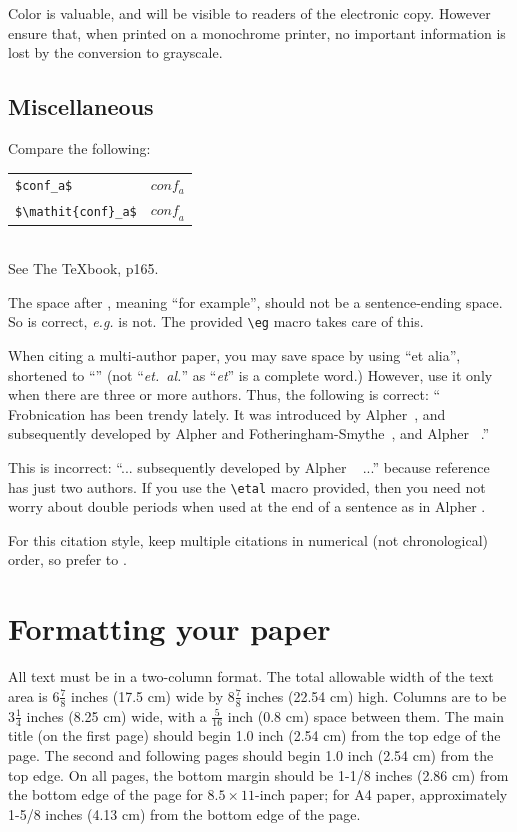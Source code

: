 \documentclass[10pt,twocolumn,letterpaper]{article}
\begin{document}
Color is valuable, and will be visible to readers of the electronic copy.
However ensure that, when printed on a monochrome printer, no important
information is lost by the conversion to grayscale.


\subsection{Miscellaneous}

\noindent
Compare the following:\\
\begin{tabular}{ll}
 \verb'$conf_a$' &  $conf_a$ \\
 \verb'$\mathit{conf}_a$' & $\mathit{conf}_a$
\end{tabular}\\
See The \TeX book, p165.

The space after \eg, meaning ``for example'', should not be a
sentence-ending space. So \eg is correct, {\em e.g.} is not.  The provided
\verb'\eg' macro takes care of this.

When citing a multi-author paper, you may save space by using ``et alia'',
shortened to ``\etal'' (not ``{\em et.\ al.}'' as ``{\em et}'' is a complete word.)
However, use it only when there are three or more authors.  Thus, the
following is correct: ``
   Frobnication has been trendy lately.
   It was introduced by Alpher~\cite{Alpher02}, and subsequently developed by
   Alpher and Fotheringham-Smythe~\cite{Alpher03}, and Alpher \etal~\cite{Alpher04}.''

This is incorrect: ``... subsequently developed by Alpher \etal~\cite{Alpher03} ...''
because reference~\cite{Alpher03} has just two authors.  If you use the
\verb'\etal' macro provided, then you need not worry about double periods
when used at the end of a sentence as in Alpher \etal.

For this citation style, keep multiple citations in numerical (not
chronological) order, so prefer \cite{Alpher03,Alpher02} to 
\cite{Alpher02,Alpher03}.


\section{Formatting your paper}

All text must be in a two-column format. The total allowable width of the
text area is $6\frac78$ inches (17.5 cm) wide by $8\frac78$ inches (22.54
cm) high. Columns are to be $3\frac14$ inches (8.25 cm) wide, with a
$\frac{5}{16}$ inch (0.8 cm) space between them. The main title (on the
first page) should begin 1.0 inch (2.54 cm) from the top edge of the
page. The second and following pages should begin 1.0 inch (2.54 cm) from
the top edge. On all pages, the bottom margin should be 1-1/8 inches (2.86
cm) from the bottom edge of the page for $8.5 \times 11$-inch paper; for A4
paper, approximately 1-5/8 inches (4.13 cm) from the bottom edge of the
page.
\end{document}
